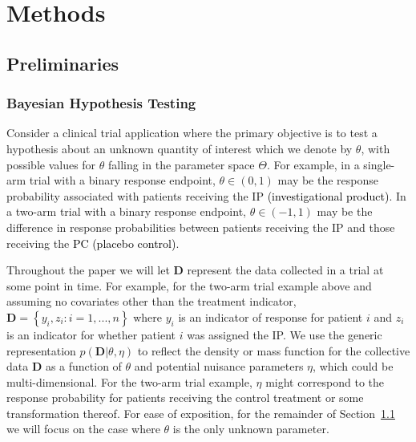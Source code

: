 \documentclass[12pt]{article}
\begin{document}
\section{Methods}\label{sec:methods}

\subsection{Preliminaries}\label{sec:preliminaries}
\subsubsection{Bayesian Hypothesis Testing}
Consider a clinical trial application where the primary objective is to test a hypothesis about an unknown quantity of interest which we denote by $\theta$, with possible values
for $\theta$ falling in the parameter space $\Theta$.
%
For example, in a single-arm trial with a binary response endpoint, $\theta \in (0,1)$ may be the response probability associated with patients receiving the IP \textcolor{black}{(investigational product)}.
%
In a two-arm trial with a binary response endpoint, $\theta \in (-1,1)$ may be the difference in response probabilities between patients receiving the IP and those receiving the \textcolor{black}{PC (placebo control)}.

Throughout the paper we will let $\mathbf{D}$ represent the data collected in a trial at some point in time. 
%
For example, for the two-arm trial example above and assuming no covariates other than the treatment indicator, $\mathbf{D}=\left\{y_i,z_i:i=1,...,n\right\}$ where $y_i$ is an indicator of response for patient $i$ and $z_i$ is an indicator for whether patient $i$ was assigned the IP.
%
We use the generic representation $p(\mathbf{D}|\theta,\eta)$ to reflect the density or mass function for the collective data $\mathbf{D}$ as 
a function of $\theta$ and potential nuisance parameters $\eta$, which could be multi-dimensional.
%
For the two-arm trial example, $\eta$ might correspond to the response probability for patients receiving the control treatment or some transformation thereof. 
For ease of exposition, for the remainder of Section~\ref{sec:preliminaries} we will focus on the case where $\theta$ is the only unknown parameter.
\end{document}
